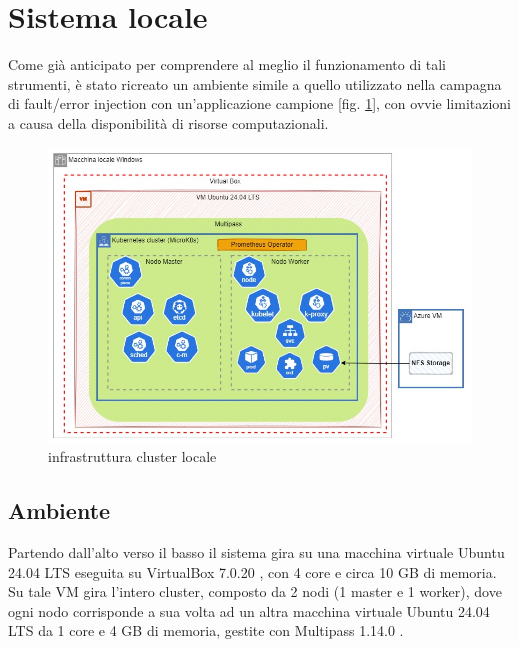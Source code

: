 \section{Sistema locale}

Come già anticipato per comprendere al meglio il funzionamento di tali strumenti, è stato ricreato un ambiente simile a quello utilizzato nella campagna di fault/error injection con un'applicazione campione [fig. \ref{fig:local-cluster}], con ovvie limitazioni a causa della disponibilità di risorse computazionali. 

\begin{figure} [ht]
    \centering
    \includegraphics[width=1\linewidth]{UNINA_BSc_Final_Report//img//explanation/local_environment.jpg}
    \caption{infrastruttura cluster locale}
    \label{fig:local-cluster}
\end{figure}

\subsection{Ambiente}
Partendo dall'alto verso il basso il sistema gira su una macchina virtuale Ubuntu 24.04 LTS \cite{Ubuntu} eseguita su VirtualBox 7.0.20 \cite{VirtualBox}, con 4 core e circa 10 GB di memoria. \\
Su tale VM gira l'intero cluster, composto da 2 nodi (1 master e 1 worker), dove ogni nodo corrisponde a sua volta ad un altra macchina virtuale Ubuntu 24.04 LTS da 1 core e 4 GB di memoria, gestite con Multipass 1.14.0 \cite{Multipass}.

